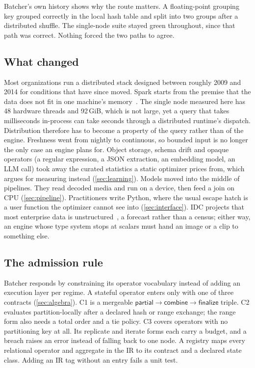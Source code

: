 \documentclass[10pt,twocolumn,letterpaper]{article}   %
\newcommand{\sys}{Batcher}
\newcommand{\pcf}{\ensuremath{\mathsf{partial}\!\rightarrow\!\mathsf{combine}\!\rightarrow\!\mathsf{finalize}}}
\newcommand{\Ca}{\textsc{C1}}
\newcommand{\Cb}{\textsc{C2}}
\newcommand{\Cc}{\textsc{C3}}
\begin{document}
\sys{}'s own history shows why the route matters. A floating-point grouping key grouped
correctly in the local hash table and split into two groups after a distributed shuffle. The
single-node suite stayed green throughout, since that path was correct. Nothing forced the two
paths to agree.

\subsection{What changed}
\label{sec:shifts}

Most organizations run a distributed stack designed between roughly 2009 and 2014 for
conditions that have since moved. Spark starts from the premise that the data does not
fit in one machine's memory~\cite{zaharia2012rdd}. The single node measured here has 48
hardware threads and 92\,GiB, which is not large, yet a query that takes milliseconds
in-process can take seconds through a distributed runtime's dispatch. Distribution therefore
has to become a property of the query rather than of the engine. Freshness went from nightly
to continuous, so bounded input is no longer the only case an engine plans for. Object storage,
schema drift and opaque operators (a regular expression, a JSON extraction, an embedding
model, an LLM call) took away the curated statistics a static optimizer prices from, which
argues for measuring instead (\cref{sec:learning}). Models moved into
the middle of pipelines. They read decoded media and run on a device, then feed a join on CPU
(\cref{sec:pipeline}). Practitioners write Python, where the usual escape hatch is a user
function the optimizer cannot see into (\cref{sec:interface}). IDC projects that most enterprise
data is unstructured~\cite{idc2018datasphere}, a forecast rather than a census; either way, an
engine whose type system stops at scalars must hand an image or a clip to something else.

\subsection{The admission rule}

\sys{} responds by constraining its operator vocabulary instead of adding an execution layer
per regime. A stateful operator enters only with one of three contracts (\cref{sec:algebra}).
\Ca{} is a mergeable \pcf{} triple. \Cb{} evaluates partition-locally after a declared hash or
range exchange; the range form also needs a total order and a tie policy. \Cc{} covers
operators with no partitioning key at all. Its replicate and iterate forms each carry a
budget, and a breach raises an error instead of falling back to one node. A registry maps
every relational operator and aggregate in the IR to its contract and a declared state class.
Adding an IR tag without an entry fails a unit test.
\end{document}
